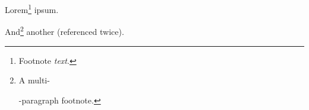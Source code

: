 Lorem\footnote{\label{fn:fnlabel}Footnote \emph{text}.
} ipsum.

And\footnote{\label{fn:1}A multi-

-paragraph footnote.
} another (referenced twice).


